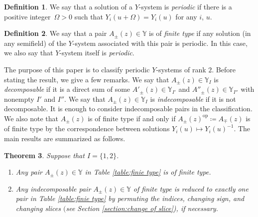 \documentclass[pdftex]{sigma}
\numberwithin{equation}{section}
\newtheorem{Theorem}{Theorem}[section]
\theoremstyle{definition}
\newtheorem{Definition}[Theorem]{Definition}
\begin{document}
\begin{Definition}\label{def:periodic}
 We say that a solution of a $Y$-system is \emph{periodic} if
 there is a positive integer~${\Omega > 0}$ such that $Y_i (u + \Omega) = Y_i (u)$
 for any $i$, $u$.
\end{Definition}

\begin{Definition}
 We say that a pair $A_\pm (z) \in \mathbb{Y}$ is of \emph{finite type} if
 any solution (in any semifield) of the $Y$-system associated with this pair is periodic.
 In this case, we also say that $Y$-system itself is \emph{periodic}.
\end{Definition}

The purpose of this paper is to classify periodic $Y$-systems of rank $2$.
Before stating the result, we give a few remarks.
We say that $A_\pm(z) \in \mathbb{Y}_I$ is \emph{decomposable} if
it is a direct sum of some $A'_\pm(z) \in \mathbb{Y}_{I'}$ and $A''_\pm(z) \in \mathbb{Y}_{I''}$
with nonempty $I'$ and $I''$.
We say that $A_\pm(z) \in \mathbb{Y}_I$ is \emph{indecomposable} if it is not decomposable.
It is enough to consider indecomposable pairs in the classification.
We also note that $A_\pm (z)$ is of finite type if and only if
$A_\pm(z)^{\mathrm{op}} \coloneqq A_\mp(z)$ is of finite type by the correspondence
between solutions $Y_i(u) \mapsto Y_i(u)^{-1}$.
The main results are summarized as follows.

\begin{Theorem}\label{theorem:main}
 Suppose that $I = \{1, 2\}$.
 \begin{enumerate}\itemsep=0pt
 \item[$(1)$] Any pair $A_\pm (z) \in \mathbb{Y}$ in Table {\rm\ref{table:finie type}} is of finite type.
 \item[$(2)$] Any indecomposable pair $A_\pm (z) \in \mathbb{Y}$ of finite type is reduced to exactly one pair in Table {\rm\ref{table:finie type}} by
 permuting the indices, changing sign, and changing slices $($see Section {\rm\ref{section:change of slice})}, if necessary.
 \end{enumerate}
\end{Theorem}
\end{document}
